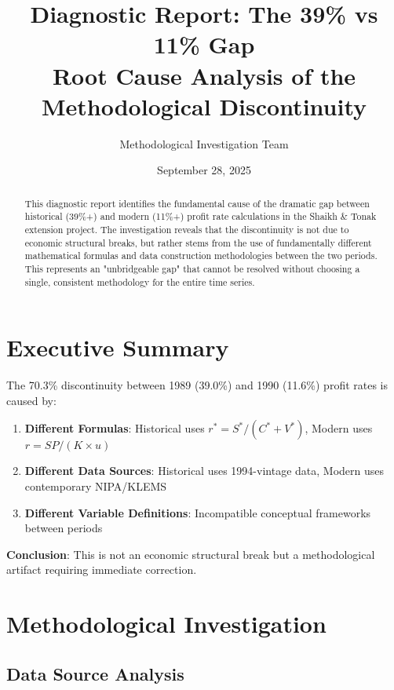 \documentclass[12pt]{article}
\title{Diagnostic Report: The 39\% vs 11\% Gap\\
\large{Root Cause Analysis of the Methodological Discontinuity}}
\author{Methodological Investigation Team}
\date{September 28, 2025}
\begin{document}
\maketitle

\begin{abstract}
This diagnostic report identifies the fundamental cause of the dramatic gap between historical (39\%+) and modern (11\%+) profit rate calculations in the Shaikh \& Tonak extension project. The investigation reveals that the discontinuity is not due to economic structural breaks, but rather stems from the use of fundamentally different mathematical formulas and data construction methodologies between the two periods. This represents an "unbridgeable gap" that cannot be resolved without choosing a single, consistent methodology for the entire time series.
\end{abstract}

\tableofcontents
\newpage

\section{Executive Summary}

\begin{tcolorbox}[colback=red!5!white,colframe=red!75!black,title=CRITICAL FINDING: Methodological Inconsistency Detected]
The 70.3\% discontinuity between 1989 (39.0\%) and 1990 (11.6\%) profit rates is caused by:

\begin{enumerate}
    \item \textbf{Different Formulas}: Historical uses $r^* = S^*/(C^* + V^*)$, Modern uses $r = SP/(K \times u)$
    \item \textbf{Different Data Sources}: Historical uses 1994-vintage data, Modern uses contemporary NIPA/KLEMS
    \item \textbf{Different Variable Definitions}: Incompatible conceptual frameworks between periods
\end{enumerate}

\textbf{Conclusion}: This is not an economic structural break but a methodological artifact requiring immediate correction.
\end{tcolorbox}

\section{Methodological Investigation}

\subsection{Data Source Analysis}
\end{document}
